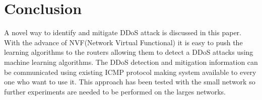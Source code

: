 \documentclass[10pt,oneside,a4paper]{article}
\begin{document}
\section{Conclusion}

A novel way to identify and mitigate DDoS attack is discussed in this paper. With the advance of NVF(Network Virtual Functional) it is easy to push the learning algorithms to the routers allowing them to detect a DDoS attacks using machine learning algorithms. The DDoS detection and mitigation information can be communicated using existing ICMP protocol making system available to every one who want to use it. This approach has been tested with the small network so further experiments are needed to be performed on the larges networks.
\pagebreak
\end{document}
